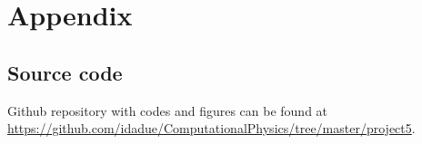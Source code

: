 \documentclass[../main.tex]{subfiles}
\begin{document}
\appendix
\renewcommand{\theequation}{A\arabic{equation}}
\setcounter{equation}{0}
\section{Appendix}
\subsection{Source code}
Github repository with codes and figures can be found at \url{https://github.com/idadue/ComputationalPhysics/tree/master/project5}.
\end{document}
